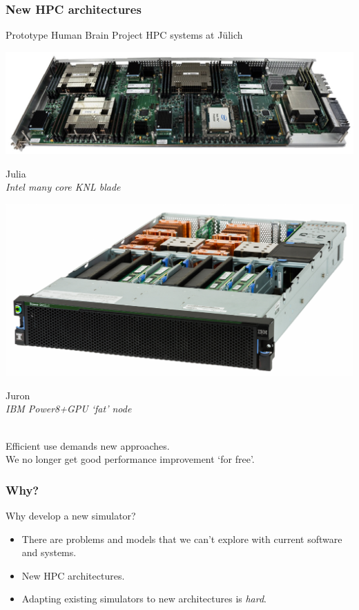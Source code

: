 \documentclass[aspectratio=43,12pt]{beamer}
\newcommand{\subheading}[1]{{\large #1}}
\begin{document}
\begin{frame}
\frametitle{New HPC architectures}

\centering
Prototype Human Brain Project HPC systems at J\"ulich\\

\vfill
\begin{minipage}[t][0.3\textheight][t]{0.4\textwidth}
\includegraphics[width=\textwidth]{images/knlnode.jpg}

\vfill
{\small\centering
Julia\\
\em Intel many core KNL blade}
\end{minipage}
\hfill
\begin{minipage}[t][0.4\textheight][t]{0.4\textwidth}
\includegraphics[width=\textwidth]{images/juron.jpg}

\vfill
{\small\centering
Juron\\
\em IBM Power8+GPU `fat' node}
\end{minipage}
\\[2ex]

\vfill
Efficient use demands new approaches.\\
We no longer get good performance improvement `for free'.

\vfill
\end{frame}

\begin{frame}
\frametitle{Why?}
\subheading{Why develop a new simulator?}
\vfill
\begin{itemize}
\item
\textcolor{light-grey}{%
There are problems and models that we can't explore
with current software and systems.}
\item
\textcolor{light-grey}{%
New HPC architectures.
}
\item
Adapting existing simulators to new architectures is \emph{hard}.
\end{itemize}
\vfill
\end{frame}
\end{document}
